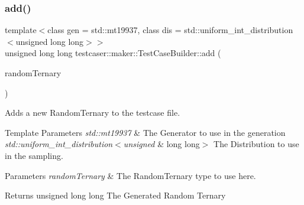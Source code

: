 \subsubsection{\texorpdfstring{add()}{add()}\hspace{0.1cm}{\footnotesize\ttfamily [6/11]}}
{\footnotesize\ttfamily template$<$class gen  = std\+::mt19937, class dis  = std\+::uniform\+\_\+int\+\_\+distribution$<$unsigned long long$>$$>$ \\
unsigned long long testcaser\+::maker\+::\+Test\+Case\+Builder\+::add (\begin{DoxyParamCaption}\item[{\hyperlink{structtestcaser_1_1maker_1_1types_1_1RandomTernary}{types\+::\+Random\+Ternary}$<$ gen, dis $>$ \&}]{random\+Ternary }\end{DoxyParamCaption})\hspace{0.3cm}{\ttfamily [inline]}}



Adds a new Random\+Ternary to the testcase file. 


\begin{DoxyTemplParams}{Template Parameters}
{\em std\+::mt19937} & The Generator to use in the generation \\
\hline
{\em std\+::uniform\+\_\+int\+\_\+distribution$<$unsigned} & long long$>$ The Distribution to use in the sampling. \\
\hline
\end{DoxyTemplParams}

\begin{DoxyParams}{Parameters}
{\em random\+Ternary} & The Random\+Ternary type to use here. \\
\hline
\end{DoxyParams}
\begin{DoxyReturn}{Returns}
unsigned long long The Generated Random Ternary 
\end{DoxyReturn}
\mbox{\label{classtestcaser_1_1maker_1_1TestCaseBuilder_adcb4d6cfafbf67234818b0b68c586ad4}} 

